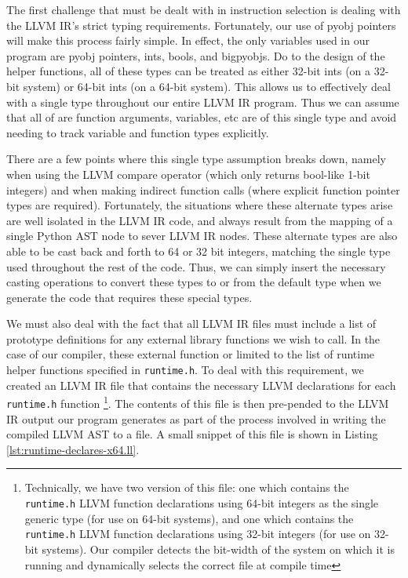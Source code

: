 \documentclass[11pt,twocolumn]{article}
\begin{document}

The first challenge that must be dealt with in instruction selection
is dealing with the LLVM IR's strict typing requirements. Fortunately,
our use of pyobj pointers will make this process fairly simple. In
effect, the only variables used in our program are pyobj pointers,
ints, bools, and bigpyobjs. Do to the design of the helper functions,
all of these types can be treated as either 32-bit ints (on a 32-bit
system) or 64-bit ints (on a 64-bit system). This allows us to
effectively deal with a single type throughout our entire LLVM IR
program. Thus we can assume that all of are function arguments,
variables, etc are of this single type and avoid needing to track
variable and function types explicitly.

There are a few points where this single type assumption breaks down,
namely when using the LLVM compare operator (which only returns
bool-like 1-bit integers) and when making indirect function calls
(where explicit function pointer types are required). Fortunately, the
situations where these alternate types arise are well isolated in the
LLVM IR code, and always result from the mapping of a single Python
AST node to sever LLVM IR nodes. These alternate types are also able
to be cast back and forth to 64 or 32 bit integers, matching the
single type used throughout the rest of the code. Thus, we can simply
insert the necessary casting operations to convert these types to or
from the default type when we generate the code that requires these
special types. 


We must also deal with the fact that all LLVM IR files must include a
list of prototype definitions for any external library functions we wish
to call. In the case of our compiler, these external function or
limited to the list of runtime helper functions specified in
\texttt{runtime.h}. To deal with this requirement, we created an LLVM
IR file that contains the necessary LLVM declarations for each
\texttt{runtime.h} function
\footnote{Technically, we have two version
  of this file: one which contains the \texttt{runtime.h} LLVM
  function declarations using 64-bit integers as the single generic
  type (for use on 64-bit systems), and one which contains the
  \texttt{runtime.h} LLVM function declarations using 32-bit integers
  (for use on 32-bit systems). Our compiler detects the bit-width of
  the system on which it is running and dynamically selects the correct
  file at compile time}.
The contents of this file is then
pre-pended to the LLVM IR output our program generates as part of
the process involved in writing the compiled LLVM AST to a file. A
small snippet of this file is shown in Listing
\ref{lst:runtime-declares-x64.ll}.
\end{document}
